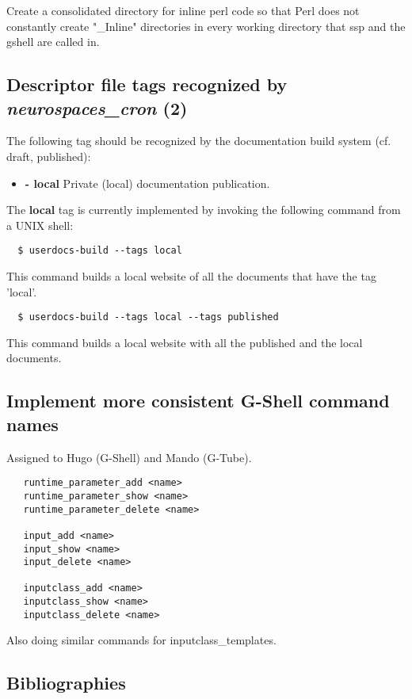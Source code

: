 \documentclass[12pt]{article}
\begin{document}
Create a consolidated directory for inline perl code so that Perl does not 
constantly create "\_Inline" directories in every working directory
that ssp and the gshell are called in. 

\subsection{Descriptor file tags recognized by {\it neurospaces\_cron} (2)}

The following tag should be recognized by the documentation build
system (cf. draft, published):
\begin{itemize}
    \item[]{\bf - local} Private (local) documentation publication.
\end{itemize}

The {\bf local} tag is currently implemented by invoking the following
command from a UNIX shell:

\begin{verbatim}
  $ userdocs-build --tags local
\end{verbatim}

This command builds a local website of all the documents that have the
tag 'local'.

\begin{verbatim}
  $ userdocs-build --tags local --tags published
\end{verbatim}

This command builds a local website with all the published and the
local documents.

\subsection{Implement more consistent G-Shell command names}

Assigned to Hugo (G-Shell) and Mando (G-Tube).

\begin{verbatim}
   runtime_parameter_add <name>
   runtime_parameter_show <name>
   runtime_parameter_delete <name>

   input_add <name>
   input_show <name>
   input_delete <name>

   inputclass_add <name>
   inputclass_show <name>
   inputclass_delete <name>
\end{verbatim}

Also doing similar commands for inputclass\_templates.


\subsection{Bibliographies}
\end{document}
